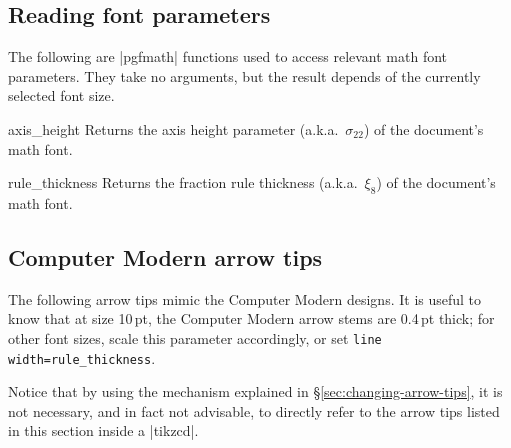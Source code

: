 \documentclass[a4paper]{ltxdoc}
\begin{document}

\subsection{Reading font parameters}
\label{sec:read-font-param}

The following are |pgfmath| functions used to access relevant math
font parameters.  They take no arguments, but the result depends of
the currently selected font size.

\begin{math-function}{axis\_height}
Returns the axis height parameter (a.k.a.\ $\sigma_{22}$) of the document's math font.
\end{math-function}

\begin{math-function}{rule\_thickness}
Returns the fraction rule thickness (a.k.a.\ $\xi_8$) of the document's math font.
\end{math-function}

\subsection{Computer Modern arrow tips}
\label{sec:comp-modern-arrow}

The following arrow tips mimic the Computer Modern designs.  It is
useful to know that at size 10\,pt, the Computer Modern arrow stems
are 0.4\,pt thick; for other font sizes, scale this parameter
accordingly, or set \texttt{line width=rule\_thickness}.

Notice that by using the mechanism explained in
\S\ref{sec:changing-arrow-tips}, it is not necessary, and in fact not
advisable, to directly refer to the arrow tips listed in this section
inside a |{tikzcd}|.
\end{document}

